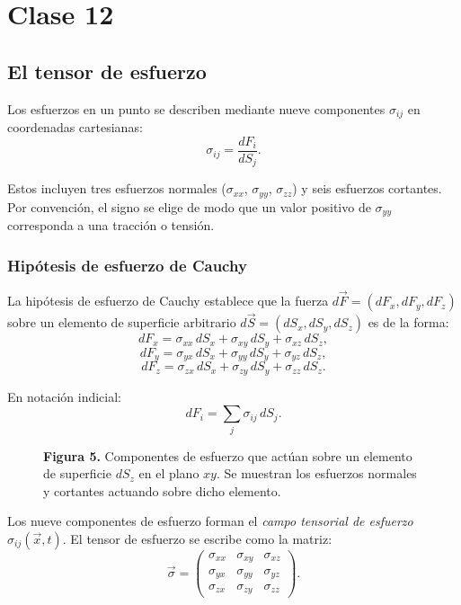 \chapter{Clase 12}

\section{El tensor de esfuerzo}

Los esfuerzos en un punto se describen mediante nueve componentes $\sigma_{ij}$ en coordenadas cartesianas:
$$ \sigma_{ij} = \frac{dF_i}{dS_j}. $$

Estos incluyen tres esfuerzos normales ($\sigma_{xx}$, $\sigma_{yy}$, $\sigma_{zz}$) y seis esfuerzos cortantes. Por convención, el signo se elige de modo que un valor positivo de $\sigma_{yy}$ corresponda a una tracción o tensión.

\subsection{Hipótesis de esfuerzo de Cauchy}

La hipótesis de esfuerzo de Cauchy establece que la fuerza $d\vec{F} = (dF_x, dF_y, dF_z)$ sobre un elemento de superficie arbitrario $d\vec{S} = (dS_x, dS_y, dS_z)$ es de la forma:
$$ dF_x = \sigma_{xx}\,dS_x + \sigma_{xy}\,dS_y + \sigma_{xz}\,dS_z, $$
$$ dF_y = \sigma_{yx}\,dS_x + \sigma_{yy}\,dS_y + \sigma_{yz}\,dS_z, $$
$$ dF_z = \sigma_{zx}\,dS_x + \sigma_{zy}\,dS_y + \sigma_{zz}\,dS_z. $$

En notación indicial:
$$ dF_i = \sum_j \sigma_{ij}\,dS_j. $$

\begin{figure}[H]
\centering

\par\medskip
\textbf{Figura 5.} Componentes de esfuerzo que actúan sobre un elemento de superficie $dS_z$ en el plano $xy$. Se muestran los esfuerzos normales y cortantes actuando sobre dicho elemento.
\end{figure}

Los nueve componentes de esfuerzo forman el \emph{campo tensorial de esfuerzo} $\sigma_{ij}(\vec{x}, t)$. El tensor de esfuerzo se escribe como la matriz:
$$ \vec{\sigma} = \begin{pmatrix} \sigma_{xx} & \sigma_{xy} & \sigma_{xz} \\ \sigma_{yx} & \sigma_{yy} & \sigma_{yz} \\ \sigma_{zx} & \sigma_{zy} & \sigma_{zz} \end{pmatrix}. $$

